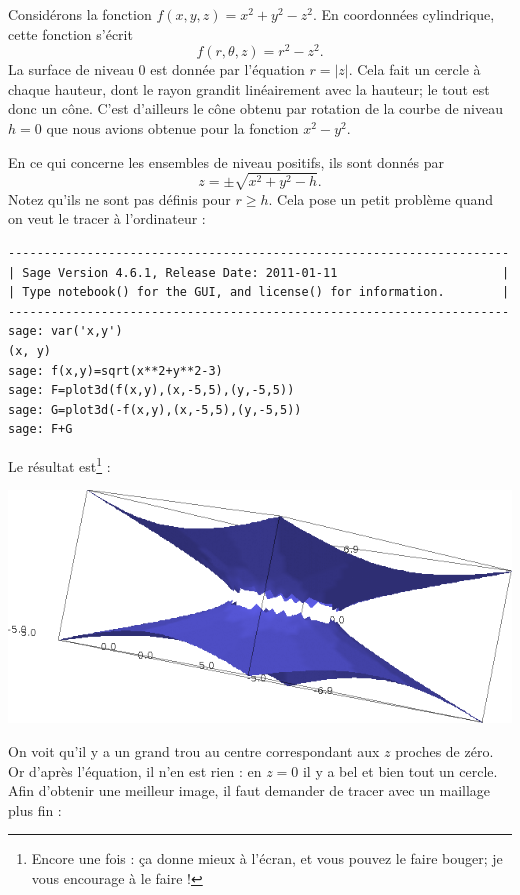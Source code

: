\begin{example}
    Considérons la fonction $f(x,y,z)=x^2+y^2-z^2$. En coordonnées cylindrique, cette fonction s'écrit
    \begin{equation}
        f(r,\theta,z)=r^2-z^2.
    \end{equation}
    La surface de niveau $0$ est donnée par l'équation $r=| z |$. Cela fait un cercle à chaque hauteur, dont le rayon grandit linéairement avec la hauteur; le tout est donc un cône. C'est d'ailleurs le cône obtenu par rotation de la courbe de niveau $h=0$ que nous avions obtenue pour la fonction $x^2-y^2$.

    En ce qui concerne les ensembles de niveau positifs, ils sont donnés par
    \begin{equation}
        z=\pm\sqrt{x^2+y^2-h}.
    \end{equation}
    Notez qu'ils ne sont pas définis pour $r\geq h$. Cela pose un petit problème quand on veut le tracer à l'ordinateur :
    \begin{verbatim}
----------------------------------------------------------------------
| Sage Version 4.6.1, Release Date: 2011-01-11                       |
| Type notebook() for the GUI, and license() for information.        |
----------------------------------------------------------------------
sage: var('x,y')
(x, y)
sage: f(x,y)=sqrt(x**2+y**2-3)
sage: F=plot3d(f(x,y),(x,-5,5),(y,-5,5)) 
sage: G=plot3d(-f(x,y),(x,-5,5),(y,-5,5))    
sage: F+G
    \end{verbatim}
Le résultat est\footnote{Encore une fois : ça donne mieux à l'écran, et vous pouvez le faire bouger; je vous encourage à le faire !} :
    \begin{center}
            \includegraphics[width=15cm]{pictures_bitmap/AdSmauvais.png}
    \end{center}
    On voit qu'il y a un grand trou au centre correspondant aux $z$ proches de zéro. Or d'après l'équation, il n'en est rien : en $z=0$ il y a bel et bien tout un cercle. Afin d'obtenir une meilleur image, il faut demander de tracer avec un maillage plus fin :

\end{example}
